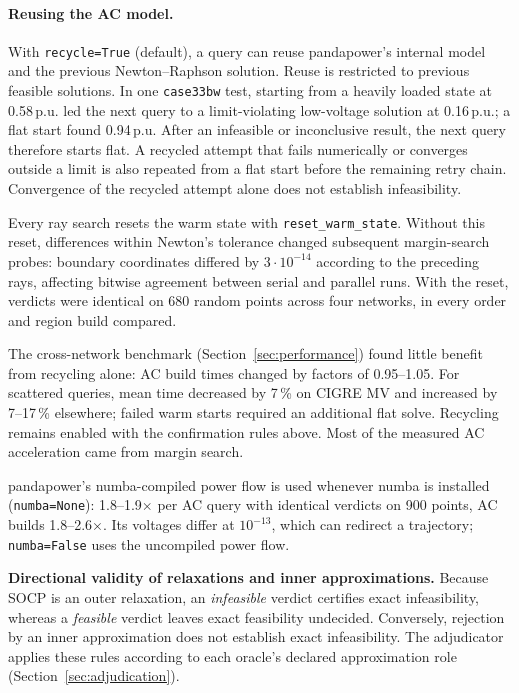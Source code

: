 \documentclass[11pt,a4paper]{report}
\newcommand{\trap}[1]{\begin{warnbox}#1\end{warnbox}}
\newcommand{\code}[1]{\texttt{\small #1}}
\begin{document}
\paragraph{Reusing the AC model.} With \code{recycle=True} (default), a query
can reuse pandapower's internal model and the previous Newton--Raphson
solution. Reuse is restricted to previous feasible solutions. In one
\code{case33bw} test, starting from a heavily loaded state at 0.58\,p.u. led
the next query to a limit-violating low-voltage solution at 0.16\,p.u.; a flat
start found 0.94\,p.u. After an infeasible or inconclusive result, the next
query therefore starts flat. A recycled attempt that fails numerically or
converges outside a limit is also repeated from a flat start before the
remaining retry chain. Convergence of the recycled attempt alone does not
establish infeasibility.

Every ray search resets the warm state with \code{reset\_warm\_state}.
Without this reset, differences within Newton's tolerance changed subsequent
margin-search probes: boundary coordinates differed by $3\cdot10^{-14}$
according to the preceding rays, affecting bitwise agreement between serial
and parallel runs. With the reset, verdicts were identical on 680 random
points across four networks, in every order and region build compared.

The cross-network benchmark (Section~\ref{sec:performance}) found little
benefit from recycling alone: AC build times changed by factors of
0.95--1.05. For scattered queries, mean time decreased by 7\,\% on CIGRE MV
and increased by 7--17\,\% elsewhere; failed warm starts required an
additional flat solve. Recycling remains enabled with the confirmation rules
above. Most of the measured AC acceleration came from margin search.

pandapower's numba-compiled power flow is used whenever numba is installed
(\code{numba=None}): 1.8--1.9$\times$ per AC query with identical verdicts on
900 points, AC builds 1.8--2.6$\times$. Its voltages differ at $10^{-13}$,
which can redirect a trajectory; \code{numba=False} uses the uncompiled
power flow.

\trap{\textbf{Directional validity of relaxations and inner approximations.}
Because SOCP is an outer relaxation, an \emph{infeasible} verdict certifies
exact infeasibility, whereas a \emph{feasible} verdict leaves exact
feasibility undecided. Conversely, rejection by an inner approximation does
not establish exact infeasibility. The adjudicator applies these rules
according to each oracle's declared approximation role
(Section~\ref{sec:adjudication}).}
\end{document}
